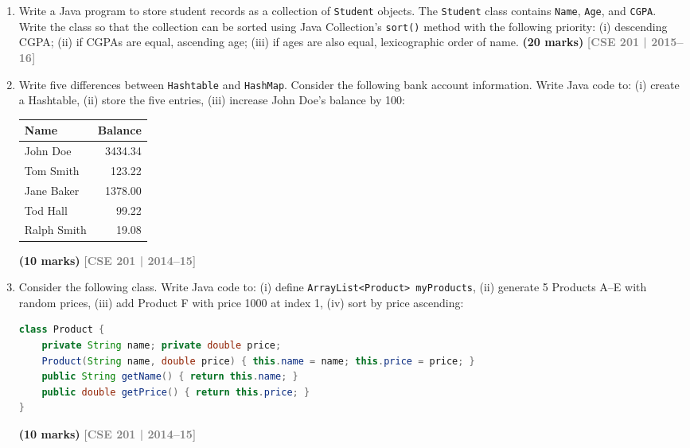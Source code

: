\documentclass[12pt,a3paper]{article}
\newcommand{\yr}[1]{\hfill\textcolor{gray}{\small\textbf{[#1]}}}
\newcommand{\mk}[1]{\textcolor{orange!70!black}{\small\textbf{(#1 marks)}}}
\begin{document}
\begin{enumerate}





\item Write a Java program to store student records as a collection of \texttt{Student} objects. The \texttt{Student} class contains \texttt{Name}, \texttt{Age}, and \texttt{CGPA}. Write the class so that the collection can be sorted using Java Collection's \texttt{sort()} method with the following priority: (i) descending CGPA; (ii) if CGPAs are equal, ascending age; (iii) if ages are also equal, lexicographic order of name. \mk{20}
\yr{CSE 201 | 2015--16}






\item Write five differences between \texttt{Hashtable} and \texttt{HashMap}. Consider the following bank account information. Write Java code to: (i) create a Hashtable, (ii) store the five entries, (iii) increase John Doe's balance by 100:
\begin{center}
\begin{tabular}{lr} \toprule \textbf{Name} & \textbf{Balance} \\ \midrule John Doe & 3434.34 \\ Tom Smith & 123.22 \\ Jane Baker & 1378.00 \\ Tod Hall & 99.22 \\ Ralph Smith & 19.08 \\ \bottomrule \end{tabular}
\end{center}
\mk{10}
\yr{CSE 201 | 2014--15}






\item Consider the following class. Write Java code to: (i) define \texttt{ArrayList<Product> myProducts}, (ii) generate 5 Products A--E with random prices, (iii) add Product F with price 1000 at index 1, (iv) sort by price ascending:
\begin{lstlisting}[language=Java]
class Product {
    private String name; private double price;
    Product(String name, double price) { this.name = name; this.price = price; }
    public String getName() { return this.name; }
    public double getPrice() { return this.price; }
}
\end{lstlisting}
\mk{10}
\yr{CSE 201 | 2014--15}


\end{enumerate}
\end{document}
